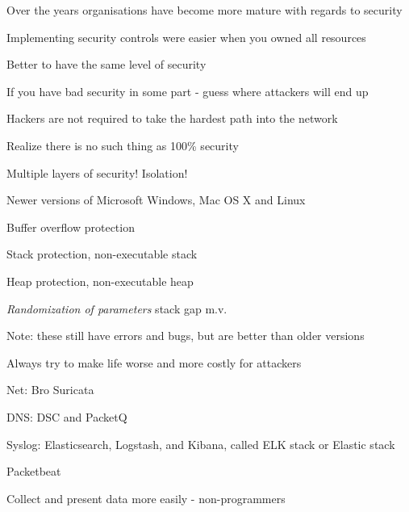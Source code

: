 \documentclass[20pt,landscape,a4paper,footrule]{foils}
\begin{document}
Over the years organisations have become more mature with regards to security

Implementing security controls were easier when you owned all resources



\begin{list1}
\item Better to have the same level of security
\item If you have bad security in some part - guess where attackers will end up
\item Hackers are not required to take the hardest path into the network
\item Realize there is no such thing as 100\% security
\end{list1}




\centerline{\hlkbig\color{security6blue} Multiple layers of security! Isolation!}



\begin{list1}
\item Newer versions of Microsoft Windows, Mac OS X and Linux
\begin{list2}
\item Buffer overflow protection
\item Stack protection, non-executable stack
\item Heap protection, non-executable heap
\item \emph{Randomization of parameters} stack gap m.v.
\end{list2}
\item Note: these still have errors and bugs, but are better than older versions

\end{list1}

\vskip 1cm

\centerline{Always try to make life worse and more costly for attackers}


\begin{list1}
\item Net: Bro  Suricata 
\item DNS: DSC and PacketQ 
\item Syslog: Elasticsearch, Logstash, and Kibana, called ELK stack or Elastic stack
\item Packetbeat 
\end{list1}
\centerline{Collect and present data more easily - non-programmers}
\end{document}
